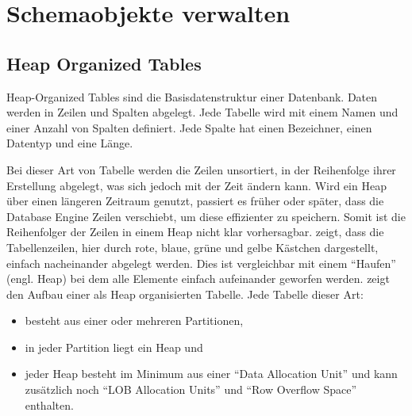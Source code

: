   \chapter{Schemaobjekte verwalten}
  \chaptertoc{}
  \cleardoubleevenpage
    \section{Heap Organized Tables}
      Heap-Organized Tables sind die Basisdatenstruktur einer Datenbank.
      Daten werden in Zeilen und Spalten abgelegt. Jede Tabelle wird mit einem
      Namen und einer Anzahl von Spalten definiert. Jede Spalte hat einen
      Bezeichner, einen Datentyp und eine L\"ange.

      Bei dieser Art von Tabelle werden die Zeilen unsortiert, in der
      Reihenfolge ihrer Erstellung abgelegt, was sich jedoch mit der Zeit ändern
      kann. Wird ein Heap über einen längeren Zeitraum genutzt, passiert es
      früher oder später, dass die Database Engine Zeilen verschiebt, um diese
      effizienter zu speichern. Somit ist die Reihenfolger der Zeilen in einem
      Heap nicht klar vorhersagbar.
       zeigt, dass die Tabellenzeilen, hier
      durch rote, blaue, gr\"une und gelbe K\"astchen dargestellt, einfach
      nacheinander abgelegt werden. Dies ist vergleichbar mit einem
      \enquote{Haufen} (engl. Heap) bei dem alle Elemente einfach aufeinander
      geworfen werden. 
\clearpage
       zeigt den Aufbau einer als Heap
      organisierten Tabelle. Jede Tabelle dieser Art:
      \begin{itemize}
        \item besteht aus einer oder mehreren Partitionen,
        \item in jeder Partition liegt ein Heap und
        \item jeder Heap besteht im Minimum aus einer \enquote{Data
        Allocation Unit} und kann zusätzlich noch \enquote{LOB Allocation
        Units} und \enquote{Row Overflow Space} enthalten.
      \end{itemize}
